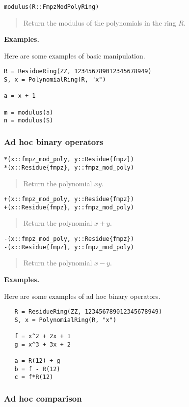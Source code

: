 \documentclass[a4paper,10pt]{article}
\newcommand{\desc}[1]{\vspace{-3mm}\begin{quote}#1\end{quote}}
\begin{document}
{{\begin{lstlisting}
modulus(R::FmpzModPolyRing)
\end{lstlisting}

\desc{Return the modulus of the polynomials in the ring $R$.}

\textbf{Examples.}

Here are some examples of basic manipulation.

\begin{lstlisting}
R = ResidueRing(ZZ, 123456789012345678949)
S, x = PolynomialRing(R, "x")

a = x + 1

m = modulus(a)
n = modulus(S)
\end{lstlisting}

\subsubsection{Ad hoc binary operators}

\begin{lstlisting}
*(x::fmpz_mod_poly, y::Residue{fmpz})
*(x::Residue{fmpz}, y::fmpz_mod_poly)
\end{lstlisting}

\desc{Return the polynomial $xy$.}

\begin{lstlisting}
+(x::fmpz_mod_poly, y::Residue{fmpz})
+(x::Residue{fmpz}, y::fmpz_mod_poly)
\end{lstlisting}

\desc{Return the polynomial $x + y$.}

\begin{lstlisting}
-(x::fmpz_mod_poly, y::Residue{fmpz})
-(x::Residue{fmpz}, y::fmpz_mod_poly)
\end{lstlisting}

\desc{Return the polynomial $x - y$.}

\textbf{Examples.}

Here are some examples of ad hoc binary operators.

\begin{lstlisting}
   R = ResidueRing(ZZ, 123456789012345678949)
   S, x = PolynomialRing(R, "x")

   f = x^2 + 2x + 1
   g = x^3 + 3x + 2

   a = R(12) + g
   b = f - R(12)
   c = f*R(12)
\end{lstlisting}

\subsubsection{Ad hoc comparison}

}}
\end{document}

